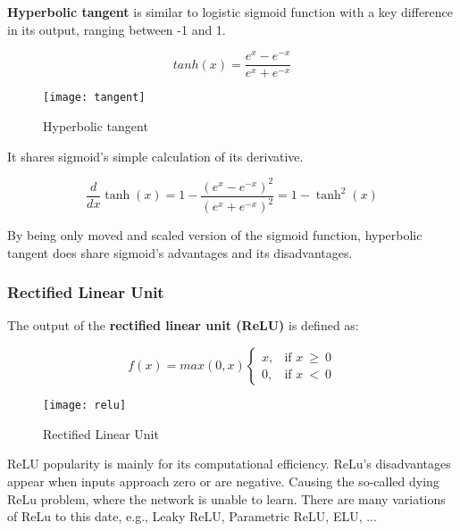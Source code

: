 \textbf{Hyperbolic tangent} is similar to logistic sigmoid function with a key difference in its output, ranging between -1 and 1.

\begin{equation}
    {tanh(x) = \frac{e^x - e^{-x}}{e^x + e^{-x}}}
\end{equation}


\begin{figure}[h]
	\centering
    \texttt{[image: tangent]}
	\caption{Hyperbolic tangent \cite{matous}}
	\label{fig:hyperbolictangent}
\end{figure}


It shares sigmoid's simple calculation of its derivative.

\begin{equation}
    {\frac{d}{dx}\tanh(x) = 1 - \frac{(e^x - e^{-x})^2}{(e^x + e^{-x})^2} = 1 -\tanh^2(x)}
\end{equation}

By being only moved and scaled version of the sigmoid function, hyperbolic tangent does share sigmoid's advantages and its disadvantages.\cite{leskovec2020mining}\cite{matous}


\subsubsection{Rectified Linear Unit}

The output of the \textbf{rectified linear unit (ReLU)} is defined as:

\begin{equation}
    f(x) = max(0,x)
\begin{cases}
    x, & \text{if $x\ \geq\ 0$}\\
    0, & \text{if $x\ <\ 0$}
\end{cases} 
\end{equation} 

\begin{figure}[h]
	\centering
    \texttt{[image: relu]}
	\caption{Rectified Linear Unit \cite{matous}}
	\label{fig:relu}
\end{figure}


ReLU popularity is mainly for its computational efficiency.\cite{7typesactivationfunctions} ReLu's disadvantages appear when inputs approach zero or are negative. Causing the so-called dying ReLu problem, where the network is unable to learn. There are many variations of ReLu to this date, e.g., Leaky ReLU, Parametric ReLU, ELU, ...

